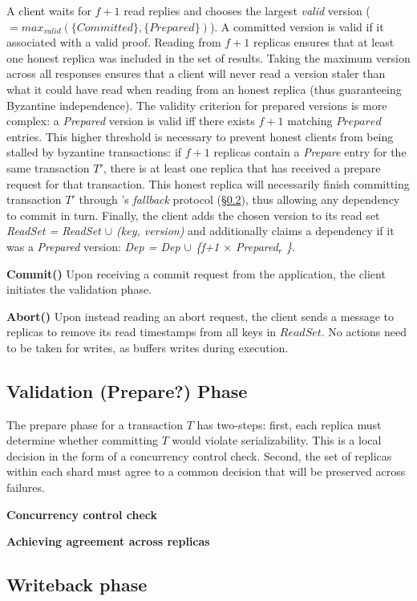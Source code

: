 
A client waits for $f+1$ read replies and chooses the largest \textit{valid} version ($=max_{valid}(\{Committed\},\{Prepared\})$).
A committed version is valid if it associated with a valid proof. 
Reading from $f+1$ replicas ensures that at least one honest replica
was included in the set of results. Taking the maximum version across all responses ensures that a client will never read a version staler than what it could have read when reading from an honest replica (thus guaranteeing Byzantine independence). The validity criterion for prepared versions is more complex: a \textit{Prepared}
version is valid iff there exists $f+1$ matching $Prepared$ entries.
 This higher threshold is necessary to prevent honest clients from being stalled by byzantine transactions: if $f+1$ replicas contain a \textit{Prepare} entry for the same transaction $T'$, there is at least one replica that has received a prepare request for that transaction. This honest replica will necessarily finish committing transaction $T'$ through \sys's \textit{fallback} protocol (\S\ref{}), thus allowing any dependency to commit in turn.
Finally, the client adds the chosen version to its read set \textit{ReadSet = ReadSet $\cup$ (key, version)} and additionally claims a dependency if it was a \textit{Prepared} version: \textit{Dep = Dep $\cup$ \{f+1 $\times$ Prepared$_r$ \}}. 

\par \textbf{Commit()} Upon receiving a commit request from the application, the client initiates the validation phase.

\par \textbf{Abort()} Upon instead reading an abort request,
the client sends a message to replicas to remove its read timestamps from all keys in $ReadSet$. No actions need to be taken for writes, as \sys buffers writes during execution.

\subsection{Validation (Prepare?) Phase}
The prepare phase for a transaction $T$ has two-steps: first,
each replica must determine whether committing $T$ would violate serializability. This is a local decision in the form of a concurrency control check. Second, the set of replicas within
each shard must agree to a common decision that will be preserved across failures. 

\par \textbf{Concurrency control check}

\par \textbf{Achieving agreement across replicas}

\subsection{Writeback phase}
